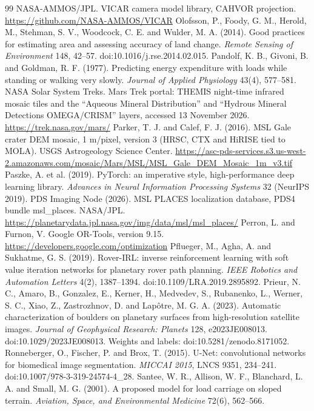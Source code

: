 \documentclass[11pt,a4paper]{article}
\begin{document}
\begin{thebibliography}{99}
 NASA-AMMOS/JPL. VICAR camera model library, CAHVOR projection. \url{https://github.com/NASA-AMMOS/VICAR}
 Olofsson, P., Foody, G. M., Herold, M., Stehman, S. V., Woodcock, C. E. and Wulder, M. A. (2014). Good practices for estimating area and assessing accuracy of land change. \emph{Remote Sensing of Environment} 148, 42--57. doi:10.1016/j.rse.2014.02.015.
 Pandolf, K. B., Givoni, B. and Goldman, R. F. (1977). Predicting energy expenditure with loads while standing or walking very slowly. \emph{Journal of Applied Physiology} 43(4), 577--581.
 NASA Solar System Treks. Mars Trek portal: THEMIS night-time infrared mosaic tiles and the ``Aqueous Mineral Distribution'' and ``Hydrous Mineral Detections OMEGA/CRISM'' layers, accessed 13 November 2026. \url{https://trek.nasa.gov/mars/}
 Parker, T. J. and Calef, F. J. (2016). MSL Gale crater DEM mosaic, 1 m/pixel, version 3 (HRSC, CTX and HiRISE tied to MOLA). USGS Astrogeology Science Center. \url{https://asc-pds-services.s3.us-west-2.amazonaws.com/mosaic/Mars/MSL/MSL_Gale_DEM_Mosaic_1m_v3.tif}
 Paszke, A. et al. (2019). PyTorch: an imperative style, high-performance deep learning library. \emph{Advances in Neural Information Processing Systems} 32 (NeurIPS 2019).
 PDS Imaging Node (2026). MSL PLACES localization database, PDS4 bundle msl\_places. NASA/JPL. \url{https://planetarydata.jpl.nasa.gov/img/data/msl/msl_places/}
 Perron, L. and Furnon, V. Google OR-Tools, version 9.15. \url{https://developers.google.com/optimization}
 Pflueger, M., Agha, A. and Sukhatme, G. S. (2019). Rover-IRL: inverse reinforcement learning with soft value iteration networks for planetary rover path planning. \emph{IEEE Robotics and Automation Letters} 4(2), 1387--1394. doi:10.1109/LRA.2019.2895892.
 Prieur, N. C., Amaro, B., Gonzalez, E., Kerner, H., Medvedev, S., Rubanenko, L., Werner, S. C., Xiao, Z., Zastrozhnov, D. and Lapôtre, M. G. A. (2023). Automatic characterization of boulders on planetary surfaces from high-resolution satellite images. \emph{Journal of Geophysical Research: Planets} 128, e2023JE008013. doi:10.1029/2023JE008013. Weights and labels: doi:10.5281/zenodo.8171052.
 Ronneberger, O., Fischer, P. and Brox, T. (2015). U-Net: convolutional networks for biomedical image segmentation. \emph{MICCAI 2015}, LNCS 9351, 234--241. doi:10.1007/978-3-319-24574-4\_28.
 Santee, W. R., Allison, W. F., Blanchard, L. A. and Small, M. G. (2001). A proposed model for load carriage on sloped terrain. \emph{Aviation, Space, and Environmental Medicine} 72(6), 562--566.

\end{thebibliography}
\end{document}
